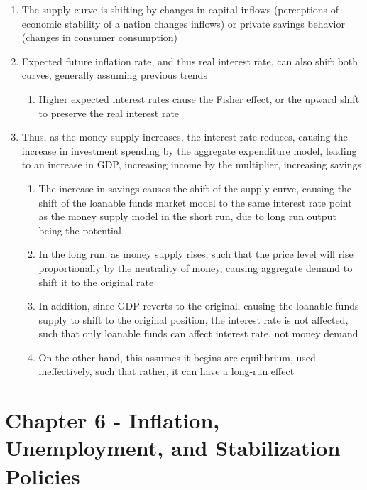 \documentclass[11 pt, twoside]{article}
\begin{document}
\begin{enumerate}
\item The supply curve is shifting by changes in capital inflows (perceptions of economic stability of a nation changes inflows) or private savings behavior (changes in consumer consumption)
\item Expected future inflation rate, and thus real interest rate, can also shift both curves, generally assuming previous trends
\begin{enumerate}
\item Higher expected interest rates cause the Fisher effect, or the upward shift to preserve the real interest rate
\end{enumerate}
\item Thus, as the money supply increases, the interest rate reduces, causing the increase in investment spending by the aggregate expenditure model, leading to an increase in GDP, increasing income by the multiplier, increasing savings
\begin{enumerate}
\item The increase in savings causes the shift of the supply curve, causing the shift of the loanable funds market model to the same interest rate point as the money supply model in the short run, due to long run output being the potential
\item In the long run, as money supply rises, such that the price level will rise proportionally by the neutrality of money, causing aggregate demand to shift it to the original rate
\item In addition, since GDP reverts to the original, causing the loanable funds supply to shift to the original position, the interest rate is not affected, such that only loanable funds can affect interest rate, not money demand
\item On the other hand, this assumes it begins are equilibrium, used ineffectively, such that rather, it can have a long-run effect
\end{enumerate}
\end{enumerate}

\section{Chapter 6 - Inflation, Unemployment, and Stabilization Policies}
\end{document}
